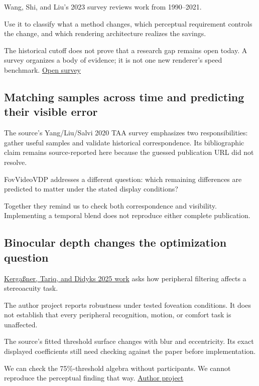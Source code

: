 Wang, Shi, and Liu's 2023 survey reviews work from 1990--2021.

Use it to classify what a method changes, which perceptual requirement controls the change, and which rendering architecture realizes the savings.

The historical cutoff does not prove that a research gap remains open today. A survey organizes a body of evidence; it is not one new renderer's speed benchmark. \href{https://link.springer.com/article/10.1007/s41095-022-0306-4}{Open survey}

\subsection{Matching samples across time and predicting their visible error}\label{04-visual-computing-ii-ch043-matching-samples-across-time-and-predicting-their-visible-error}

The source's Yang/Liu/Salvi 2020 TAA survey emphasizes two responsibilities: gather useful samples and validate historical correspondence. Its bibliographic claim remains source-reported here because the guessed publication URL did not resolve.

FovVideoVDP addresses a different question: which remaining differences are predicted to matter under the stated display conditions?

Together they remind us to check both correspondence and visibility. Implementing a temporal blend does not reproduce either complete publication.

\subsection{Binocular depth changes the optimization question}\label{04-visual-computing-ii-ch043-binocular-depth-changes-the-optimization-question}

\hyperref[appendix-8dc848f14052]{Kergaßner, Tariq, and Didyk\textquotesingle s 2025 work} asks how peripheral filtering affects a stereoacuity task.

The author project reports robustness under tested foveation conditions. It does not establish that every peripheral recognition, motion, or comfort task is unaffected.

The source's fitted threshold surface changes with blur and eccentricity. Its exact displayed coefficients still need checking against the paper before implementation.

We can check the 75\%-threshold algebra without participants. We cannot reproduce the perceptual finding that way. \href{https://sophie-kergassner.github.io/depth-in-periphery.html}{Author project}

